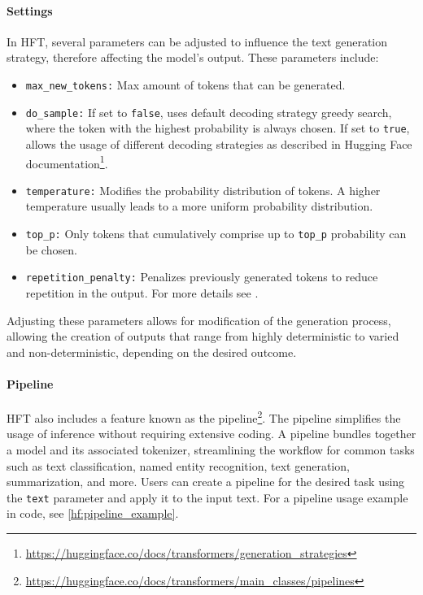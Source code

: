 \documentclass[english, ba, kiv, he, iso690numb, pdf, viewonly]{fasthesis}
\begin{document}
	\paragraph{Settings}\label{impl:hf:inference_settings}
	In HFT, several parameters can be adjusted to influence the text generation strategy, therefore affecting the model's output. These parameters include:
	\begin{itemize}
		\item \texttt{max\_new\_tokens:} Max amount of tokens that can be generated.
		\item \texttt{do\_sample:} If set to \texttt{false}, uses default decoding strategy greedy search, where the token with the highest probability is always chosen. If set to \texttt{true}, allows the usage of different decoding strategies as described in Hugging Face documentation\footnote{\url{https://huggingface.co/docs/transformers/generation_strategies}}.
		\item \texttt{temperature:} Modifies the probability distribution of tokens. A higher temperature usually leads to a more uniform probability distribution.
		\item \texttt{top\_p:} Only tokens that cumulatively comprise up to \texttt{top\_p} probability can be chosen.
		\item \texttt{repetition\_penalty:} Penalizes previously generated tokens to reduce repetition in the output. For more details see \cite{keskar2019ctrl}.
	\end{itemize}
	Adjusting these parameters allows for modification of the generation process, allowing the creation of outputs that range from highly deterministic to varied and non-deterministic, depending on the desired outcome.
	
	\paragraph{Pipeline} \label{hf:pipeline}
	HFT also includes a feature known as the pipeline\footnote{\url{https://huggingface.co/docs/transformers/main_classes/pipelines}}. The pipeline simplifies the usage of inference without requiring extensive coding. A pipeline bundles together a model and its associated tokenizer, streamlining the workflow for common tasks such as text classification, named entity recognition, text generation, summarization, and more. Users can create a pipeline for the desired task using the \texttt{text} parameter and apply it to the input text. For a pipeline usage example in code, see \ref{hf:pipeline_example}.
	
\end{document}
